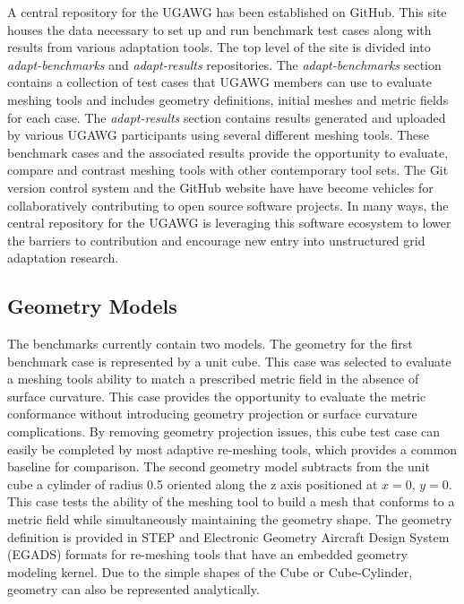 \documentclass[3p,times,procedia,number]{elsarticle}
\begin{document}
A central repository for the UGAWG has been established on GitHub.\cite{ugawg-website}
This site houses the data necessary to set up and run benchmark test cases along with results from various adaptation tools.
The top level of the site is divided into \emph{adapt-benchmarks} and \emph{adapt-results} repositories.
The \emph{adapt-benchmarks} section contains a collection of test cases that UGAWG members can use to evaluate meshing
tools and includes geometry definitions, initial meshes and metric fields for each case.
The \emph{adapt-results} section contains results generated and uploaded by various UGAWG participants using several different meshing tools.
These benchmark cases and the associated results provide the opportunity to evaluate,
compare and contrast meshing tools with other contemporary tool sets.
The Git version control system and the GitHub website have have become
vehicles for collaboratively contributing to open source software
projects.
In many ways, the central repository for the UGAWG is leveraging
this software ecosystem to lower the barriers to contribution
and encourage new entry into unstructured grid adaptation research.

\subsection{Geometry Models}

The benchmarks currently contain two models.
The geometry for the first benchmark case is represented by a unit cube.
This case was selected to evaluate a meshing tools ability to match a prescribed metric field in the absence of surface curvature.
This case provides the opportunity to evaluate the metric conformance without introducing geometry projection or surface curvature complications.
By removing geometry projection issues, this cube test case can easily be completed by most adaptive re-meshing tools,
which provides a common baseline for comparison.
The second geometry model subtracts from the unit cube a cylinder of radius 0.5 oriented along the z axis positioned at $x=0$, $y=0$.
This case tests the ability of the meshing tool to build a mesh that conforms to a metric field while simultaneously maintaining the geometry shape.
The geometry definition is provided in STEP and 
Electronic Geometry Aircraft Design System
(EGADS\cite{haimes-drela-egads})
formats for re-meshing tools that have an embedded geometry modeling kernel.
Due to the simple shapes of the Cube or Cube-Cylinder,
geometry can also be represented analytically.   
\end{document}
